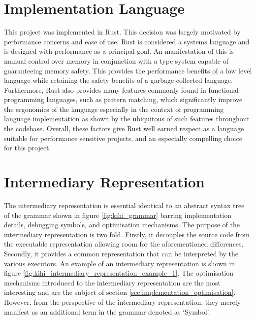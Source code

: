 
\section{Implementation Language}
This project was implemented in Rust. This decision was largely motivated by performance concerns and ease of use. Rust is considered a systems language and is designed with performance as a principal goal. An manifestation of this is manual control over memory in conjunction with a type system capable of guaranteeing memory safety. This provides the performance benefits of a low level language while retaining the safety benefits of a garbage collected language. Furthermore, Rust also provides many features commonly found in functional programming languages, such as pattern matching, which significantly improve the ergonomics of the language especially in the context of programming language implementation as shown by the ubiquitous of such features throughout the codebase. Overall, these factors give Rust well earned respect as a language suitable for performance sensitive projects, and an especially compelling choice for this project.


\section{Intermediary Representation}\label{sec:implementation_intermediary_representation}
The intermediary representation is essential identical to an abstract syntax tree of the grammar shown in figure \ref{fig:kihi_grammar} barring implementation details, debugging symbols, and optimisation mechanisms. The purpose of the intermediary representation is two fold. Firstly, it decouples the source code from the executable representation allowing room for the aforementioned differences. Secondly, it provides a common representation that can be interpreted by the various executors. An example of an intermediary representation is shown in figure \ref{fig:kihi_intermediary_representation_example_1}. The optimisation mechanisms introduced to the intermediary representation are the most interesting and are the subject of section \ref{sec:implementation_optimisation}. However, from the perspective of the intermediary representation, they merely manifest as an additional term in the grammar denoted as `Symbol'.

